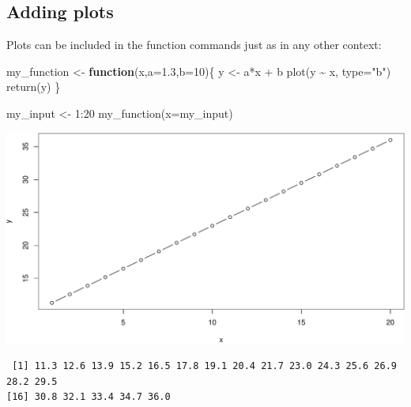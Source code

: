 \documentclass[
]{book}
\newenvironment{Shaded}{\begin{snugshade}}{\end{snugshade}}
\newcommand{\AttributeTok}[1]{\textcolor[rgb]{0.77,0.63,0.00}{#1}}
\newcommand{\ControlFlowTok}[1]{\textcolor[rgb]{0.13,0.29,0.53}{\textbf{#1}}}
\newcommand{\DecValTok}[1]{\textcolor[rgb]{0.00,0.00,0.81}{#1}}
\newcommand{\FloatTok}[1]{\textcolor[rgb]{0.00,0.00,0.81}{#1}}
\newcommand{\FunctionTok}[1]{\textcolor[rgb]{0.00,0.00,0.00}{#1}}
\newcommand{\NormalTok}[1]{#1}
\newcommand{\OtherTok}[1]{\textcolor[rgb]{0.56,0.35,0.01}{#1}}
\newcommand{\SpecialCharTok}[1]{\textcolor[rgb]{0.00,0.00,0.00}{#1}}
\newcommand{\StringTok}[1]{\textcolor[rgb]{0.31,0.60,0.02}{#1}}
\begin{document}
\hypertarget{adding-plots}{%
\subsection*{Adding plots}\label{adding-plots}}

Plots can be included in the function commands just as in any other context:

\begin{Shaded}
\begin{Highlighting}[]
\NormalTok{my\_function }\OtherTok{\textless{}{-}} \ControlFlowTok{function}\NormalTok{(x,}\AttributeTok{a=}\FloatTok{1.3}\NormalTok{,}\AttributeTok{b=}\DecValTok{10}\NormalTok{)\{}
\NormalTok{  y }\OtherTok{\textless{}{-}}\NormalTok{ a}\SpecialCharTok{*}\NormalTok{x }\SpecialCharTok{+}\NormalTok{ b}
  \FunctionTok{plot}\NormalTok{(y }\SpecialCharTok{\textasciitilde{}}\NormalTok{ x, }\AttributeTok{type=}\StringTok{"b"}\NormalTok{)}
  \FunctionTok{return}\NormalTok{(y)}
\NormalTok{\}}
\end{Highlighting}
\end{Shaded}

\begin{Shaded}
\begin{Highlighting}[]
\NormalTok{my\_input }\OtherTok{\textless{}{-}} \DecValTok{1}\SpecialCharTok{:}\DecValTok{20}
\FunctionTok{my\_function}\NormalTok{(}\AttributeTok{x=}\NormalTok{my\_input)}
\end{Highlighting}
\end{Shaded}

\includegraphics{figures/unnamed-chunk-290-1.pdf}

\begin{verbatim}
 [1] 11.3 12.6 13.9 15.2 16.5 17.8 19.1 20.4 21.7 23.0 24.3 25.6 26.9 28.2 29.5
[16] 30.8 32.1 33.4 34.7 36.0
\end{verbatim}
\end{document}
